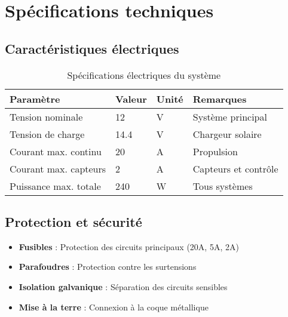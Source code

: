 \section{Spécifications techniques}
\subsection{Caractéristiques électriques}
\begin{table}[!htbp]
    \centering
    \caption{Spécifications électriques du système}
    \label{tab:electrical-specs}
    \begin{tabular}{llll}
        \toprule
        \textbf{Paramètre} & \textbf{Valeur} & \textbf{Unité} & \textbf{Remarques} \\
        \midrule
        Tension nominale & 12 & V & Système principal \\
        Tension de charge & 14.4 & V & Chargeur solaire \\
        Courant max. continu & 20 & A & Propulsion \\
        Courant max. capteurs & 2 & A & Capteurs et contrôle \\
        Puissance max. totale & 240 & W & Tous systèmes \\
        \bottomrule
    \end{tabular}
\end{table}

\subsection{Protection et sécurité}
\begin{itemize}
    \item \textbf{Fusibles} : Protection des circuits principaux (20A, 5A, 2A)
    \item \textbf{Parafoudres} : Protection contre les surtensions
    \item \textbf{Isolation galvanique} : Séparation des circuits sensibles
    \item \textbf{Mise à la terre} : Connexion à la coque métallique
\end{itemize}

